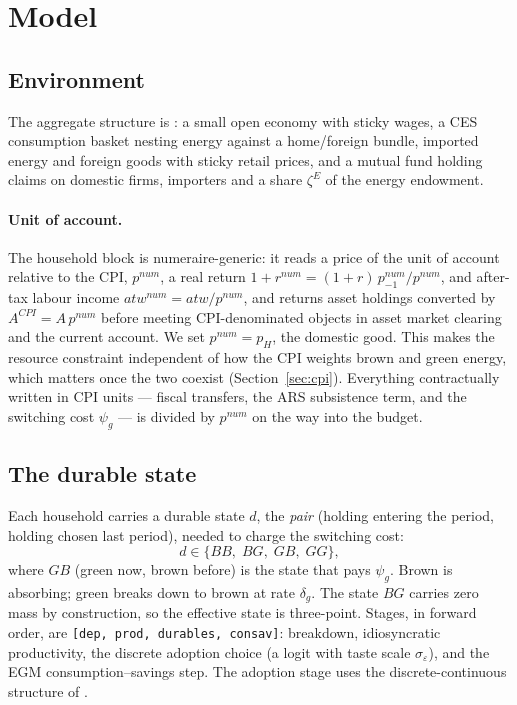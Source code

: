 \documentclass[11pt,a4paper]{article}
\begin{document}
\section{Model}

\subsection{Environment}

The aggregate structure is \citet{ARS2024}: a small open economy with sticky
wages, a CES consumption basket nesting energy against a home/foreign bundle,
imported energy and foreign goods with sticky retail prices, and a mutual fund
holding claims on domestic firms, importers and a share $\zeta^{E}$ of the
energy endowment.

\paragraph{Unit of account.} The household block is numeraire-generic: it
reads a price of the unit of account relative to the CPI, $p^{num}$, a real
return $1+r^{num}=(1+r)\,p^{num}_{-1}/p^{num}$, and after-tax labour income
$atw^{num}=atw/p^{num}$, and returns asset holdings converted by
$A^{CPI}=A\,p^{num}$ before meeting CPI-denominated objects in asset market
clearing and the current account. We set $p^{num}=p_{H}$, the domestic good.
This makes the resource constraint independent of how the CPI weights brown
and green energy, which matters once the two coexist (Section~\ref{sec:cpi}).
Everything contractually written in CPI units --- fiscal transfers, the ARS
subsistence term, and the switching cost $\psi_g$ --- is divided by $p^{num}$
on the way into the budget.

\subsection{The durable state}

Each household carries a durable state $d$, the \emph{pair} (holding entering
the period, holding chosen last period), needed to charge the switching cost:
\[
d\in\{BB,\;BG,\;GB,\;GG\},
\]
where $GB$ (green now, brown before) is the state that pays $\psi_g$. Brown is
absorbing; green breaks down to brown at rate $\delta_g$. The state $BG$
carries zero mass by construction, so the effective state is three-point.
Stages, in forward order, are \texttt{[dep, prod, durables, consav]}:
breakdown, idiosyncratic productivity, the discrete adoption choice (a logit
with taste scale $\sigma_{\varepsilon}$), and the EGM consumption--savings
step. The adoption stage uses the discrete-continuous structure of
\citet{DCEGM2017}.
\end{document}
